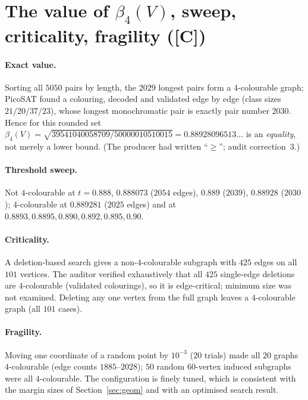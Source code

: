 \documentclass[10pt]{article}
\newcommand{\tier}[1]{\textsf{[#1]}}
\newcommand{\tC}{\tier{C}}
\newcommand{\bb}{\beta}
\begin{document}
\section{The value of $\bb_4(V)$, sweep, criticality, fragility (\tC{})}\label{sec:struct}
\paragraph{Exact value.} Sorting all $5050$ pairs by length, the $2029$ longest pairs form a $4$-colourable graph; PicoSAT found a colouring, decoded and validated edge by edge (class sizes $21/20/37/23$), whose longest monochromatic pair is exactly pair number $2030$. Hence for this rounded set $\bb_4(V)=\sqrt{39541040058709/50000010510015}=0.88928096513\ldots$ is an \emph{equality}, not merely a lower bound. (The producer had written ``$\ge$''; audit correction~3.)
\paragraph{Threshold sweep.} Not $4$-colourable at $t=0.888$, $0.888073$ ($2054$ edges), $0.889$ ($2039$), $0.88928$ ($2030$); $4$-colourable at $0.889281$ ($2025$ edges) and at $0.8893,0.8895,0.890,0.892,0.895,0.90$.
\paragraph{Criticality.} A deletion-based search gives a non-$4$-colourable subgraph with $425$ edges on all $101$ vertices. The auditor verified exhaustively that all $425$ single-edge deletions are $4$-colourable (validated colourings), so it is edge-critical; minimum size was not examined. Deleting any one vertex from the full graph leaves a $4$-colourable graph (all $101$ cases).
\paragraph{Fragility.} Moving one coordinate of a random point by $10^{-3}$ ($20$ trials) made all $20$ graphs $4$-colourable (edge counts $1885$--$2028$); $50$ random $60$-vertex induced subgraphs were all $4$-colourable. The configuration is finely tuned, which is consistent with the margin sizes of Section~\ref{sec:geom} and with an optimised search result.
\end{document}
